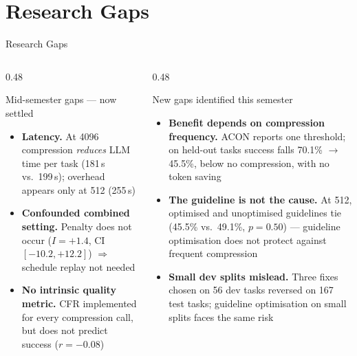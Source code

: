 \documentclass[aspectratio=169,10pt]{beamer}
\begin{document}
\section{Research Gaps}
\begin{frame}{Research Gaps}
\begin{columns}[T]
\begin{column}{0.48\textwidth}
\begin{block}{Mid-semester gaps --- now settled}
\footnotesize
\begin{itemize}
  \item[(a)] \textbf{Latency.} At 4096 compression \emph{reduces} LLM time per
        task (181\,s vs.\ 199\,s); overhead appears only at 512 (255\,s)
  \item[(b)] \textbf{Confounded combined setting.} Penalty does not occur
        ($I=+1.4$, CI $[-10.2,+12.2]$) $\Rightarrow$ schedule replay not needed
  \item[(c)] \textbf{No intrinsic quality metric.} CFR implemented for every
        compression call, but does not predict success ($r=-0.08$)
\end{itemize}
\end{block}
\end{column}
\begin{column}{0.48\textwidth}
\begin{alertblock}{New gaps identified this semester}
\footnotesize
\begin{itemize}
  \item[(d)] \textbf{Benefit depends on compression frequency.} ACON reports
        one threshold; on held-out tasks success falls 70.1\% $\to$ 45.5\%,
        below no compression, with no token saving
  \item[(e)] \textbf{The guideline is not the cause.} At 512, optimised and
        unoptimised guidelines tie (45.5\% vs.\ 49.1\%, $p=0.50$) ---
        guideline optimisation does not protect against frequent compression
  \item[(f)] \textbf{Small dev splits mislead.} Three fixes chosen on 56 dev
        tasks reversed on 167 test tasks; guideline optimisation on small
        splits faces the same risk
\end{itemize}
\end{alertblock}
\end{column}
\end{columns}
\end{frame}
\end{document}
